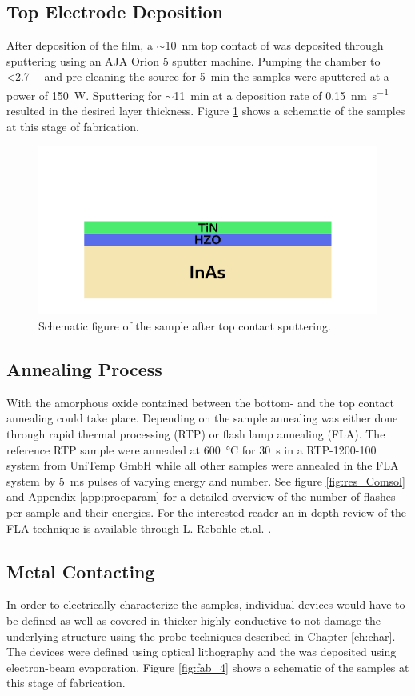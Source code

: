 \documentclass[11pt,twoside,final]{eitExjobb}  %
\begin{document}
\subsection{Top Electrode Deposition}
After deposition of the  film, a $\sim$\SI{10}{\nano\meter} top
contact of  was deposited through sputtering using an AJA Orion 5
sputter machine. Pumping the chamber to <\SI{2.7}{\milli\torr} and pre-cleaning
the source for \SI{5}{\minute} the samples were sputtered at a power of
\SI{150}{\watt}. Sputtering for $\sim$\SI{11}{\minute} at a deposition rate of
\SI{0.15}{\nano\meter\per\second} resulted in the desired layer thickness.
Figure \ref{fig:fab_3} shows a schematic of the samples at this stage of
fabrication.

\begin{figure}[htbp]
    \centering
    \includegraphics[width=.45\linewidth]{fig/fabproc/fab_3.png}
    \caption{Schematic figure of the sample after top contact
    sputtering.}\label{fig:fab_3}
\end{figure}

\subsection{Annealing Process}
With the amorphous oxide contained between the bottom- and the top contact annealing
could take place. Depending on the sample annealing was either done through
rapid thermal processing (RTP) or flash lamp annealing (FLA). The reference RTP
sample were annealed at \SI{600}{\celsius} for \SI{30}{\second} in a
RTP-1200-100 system from UniTemp GmbH while all other samples were annealed in
the FLA system by \SI{5}{\milli\second} pulses of varying energy and number.
See figure \ref{fig:res_Comsol} and Appendix \ref{app:procparam} for a detailed
overview of the number of flashes per sample and their energies. For the
interested reader an in-depth review of the FLA technique is available through
L. Rebohle et.al. \cite{rebohle2016review}.

\subsection{Metal Contacting}
In order to electrically characterize the samples, individual devices would
have to be defined as well as covered in thicker highly conductive  to
not damage the underlying structure using the probe techniques described in
Chapter \ref{ch:char}. The devices were defined using optical lithography and
the  was deposited using electron-beam evaporation. Figure
\ref{fig:fab_4} shows a schematic of the samples at this stage of fabrication.
\end{document}

